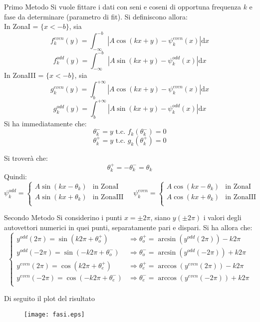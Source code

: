 \begin{paragraph}{Primo Metodo}
Si vuole fittare i dati con seni e coseni di opportuna frequenza $k$
e fase da determinare (parametro di fit). Si definiscono allora:\\
  In ZonaI = $\{x<-b\}$, sia
        $$f^{even}_k(y) = \int_{-\infty}^{-b} | A\cos(kx+y)-\psi_k^{even}(x)| \mathrm d x $$
        $$f^{odd}_k(y) = \int_{-\infty}^{-b} | A\sin(kx+y)-\psi_k^{odd}(x)| \mathrm d x $$
  In ZonaIII = $\{x<-b\}$, sia
        $$g^{even}_k(y) = \int_{b}^{+\infty} |A\cos(kx+y)-\psi_k^{even}(x)| \mathrm d x $$
        $$g^{odd}_k(y) = \int_{b}^{+\infty} |A\sin(kx+y)-\psi_k^{odd}(x)| \mathrm d x $$
Si ha immediatamente che:
    $$ \theta^-_k = y \mbox{ t.c. } f_k(\theta^-_k) = 0 $$
    $$ \theta^+_k = y \mbox{ t.c. } g_k(\theta^+_k) = 0 $$
\end{paragraph}
Si troverà che:
    $$ \theta^+_k = -\theta^-_k = \theta_k $$
Quindi:
$$ \psi_k^{odd} = \begin{cases}
    A\sin(kx - \theta_k) & \mbox{in ZonaI} \\
    A\sin(kx + \theta_k) & \mbox{in ZonaIII} \\
\end{cases}
\quad
\psi_k^{even} = \begin{cases}
    A\cos(kx - \theta_k) & \mbox{in ZonaI} \\
    A\cos(kx + \theta_k) & \mbox{in ZonaIII} \\
\end{cases}
$$

\begin{paragraph}{Secondo Metodo}
Si considerino i punti $x = \pm 2\pi$, siano $y(\pm 2\pi)$ i valori degli autovettori
numerici in quei punti, separatamente pari e dispari. Si ha allora che:
$$ \begin{cases}
    y^{odd}(2\pi)   = \sin(k2\pi  + \theta_o^+)  & \Rightarrow \theta_o^+ = \arcsin(y^{odd}(2\pi)) - k2\pi\\
    y^{odd}(-2\pi)  = \sin(-k2\pi + \theta_o^-)  & \Rightarrow \theta_o^- = \arcsin(y^{odd}(-2\pi)) + k2\pi\\
    y^{even}(2\pi)  = \cos(k2\pi  + \theta_e^+)  & \Rightarrow \theta_e^+ = \arccos(y^{even}(2\pi)) - k2\pi\\
    y^{even}(-2\pi) = \cos(-k2\pi + \theta_e^-)  & \Rightarrow \theta_e^- = \arccos(y^{even}(-2\pi)) + k2\pi\\
\end{cases}$$
\end{paragraph}
Di seguito il plot del risultato\\
\begin{figure}[h]
  \centering
  \texttt{[image: fasi.eps]}
\end{figure}
